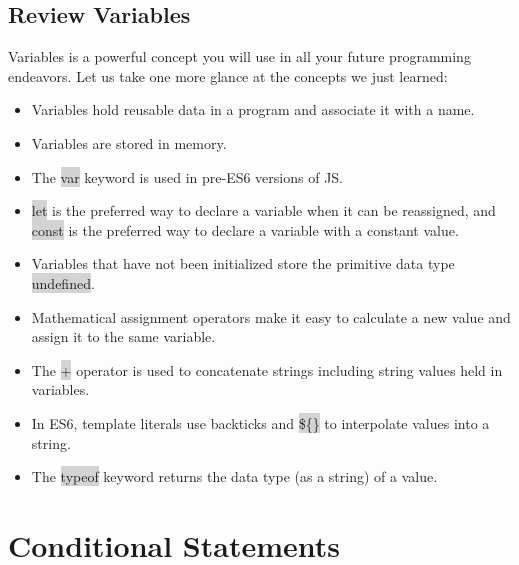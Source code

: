 \documentclass[11pt]{article}
\begin{document}
\subsection{Review Variables}
Variables is a powerful concept you will use in all your future programming endeavors. Let us take one more glance at the concepts we just learned:
\begin{itemize}[leftmargin = *]
\item Variables hold reusable data in a program and associate it with a name. 
\item Variables are stored in memory.
\item The \colorbox{lightgray}{var} keyword is used in pre-ES6 versions of JS. 
\item \colorbox{lightgray}{let} is the preferred way to declare a variable when it can be reassigned, and \colorbox{lightgray}{const} is the preferred way to declare a variable with a constant value.
\item Variables that have not been initialized store the primitive data type \colorbox{lightgray}{undefined}. 
\item Mathematical assignment operators make it easy to calculate a new value and assign it to the same variable. 
\item The \colorbox{lightgray}{+} operator is used to concatenate strings including string values held in variables. 
\item In ES6, template literals use backticks \colorbox{lightgray}{\textasciigrave} and \colorbox{lightgray}{\$\{\}} to interpolate values into a string.
\item The \colorbox{lightgray}{typeof} keyword returns the data type (as a string) of a value.
\end{itemize}

\newpage
\section{Conditional Statements}
\end{document}
